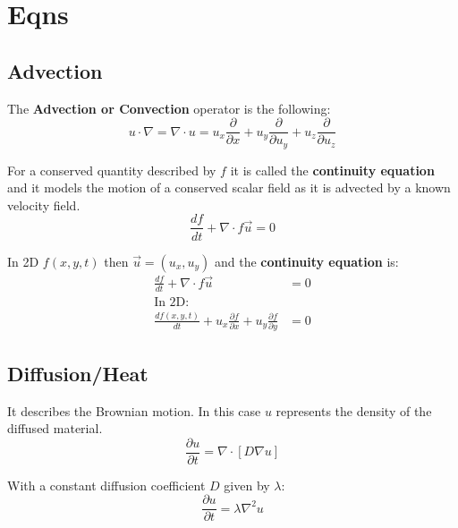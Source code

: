 \documentclass[doc]{apa}
\begin{document}
\tableofcontents
\setlength\parindent{0pt} 

\section{Eqns}

\subsection{\color{blue}Advection}
The \textbf{Advection or Convection} operator is the following:
\begin{equation}
u \cdot \nabla =\nabla \cdot u  = u_x \frac{\partial}{\partial x} + u_y \frac{\partial}{\partial u_y} + u_z \frac{\partial}{\partial u_z}
\end{equation}


For a conserved quantity described by $f$ it is called the  \textbf{continuity equation} and 
it models the motion of a conserved scalar field as it is advected by a known velocity field. 
\begin{equation}
    \frac{df}{dt} + \nabla \cdot f \vec u  = 0   
\end{equation}

In 2D $f(x,y,t)$ then $\vec u = (u_x, u_y)$ and the \textbf{continuity equation} is: 
\begin{equation}
\begin{split}
    \frac{df}{dt} + \nabla \cdot f \vec u  & = 0  \\
    \text{In 2D:} \\
    \frac{df(x,y,t)}{dt} + u_x \frac{\partial f}{\partial x} + u_y \frac{\partial f}{\partial y}&  = 0  
\end{split}
\end{equation}

\subsection{\color{blue}Diffusion/Heat}
It describes the Brownian motion. 
In this case $u$ represents the density of the diffused material. 
\begin{equation}
    \frac{\partial u}{\partial t} = \nabla \cdot [D \nabla u]
\end{equation}

With a constant diffusion coefficient $D$ given by $\lambda$:
\begin{equation}
    \frac{\partial u}{\partial t} = \lambda \nabla^2 u
\end{equation}
\end{document}
